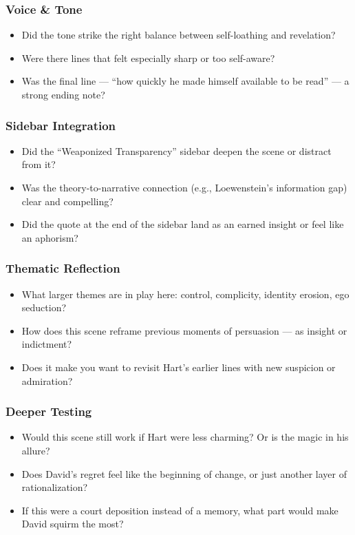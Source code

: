 \subsubsection*{Voice \& Tone}

\begin{itemize}
  \item Did the tone strike the right balance between self-loathing and revelation?
  \item Were there lines that felt especially sharp or too self-aware?
  \item Was the final line — ``how quickly he made himself available to be read'' — a strong ending note?
\end{itemize}

\subsubsection*{Sidebar Integration}

\begin{itemize}
  \item Did the ``Weaponized Transparency'' sidebar deepen the scene or distract from it?
  \item Was the theory-to-narrative connection (e.g., Loewenstein’s information gap) clear and compelling?
  \item Did the quote at the end of the sidebar land as an earned insight or feel like an aphorism?
\end{itemize}

\subsubsection*{Thematic Reflection}

\begin{itemize}
  \item What larger themes are in play here: control, complicity, identity erosion, ego seduction?
  \item How does this scene reframe previous moments of persuasion — as insight or indictment?
  \item Does it make you want to revisit Hart’s earlier lines with new suspicion or admiration?
\end{itemize}

\subsubsection*{Deeper Testing}

\begin{itemize}
  \item Would this scene still work if Hart were less charming? Or is the magic in his allure?
  \item Does David’s regret feel like the beginning of change, or just another layer of rationalization?
  \item If this were a court deposition instead of a memory, what part would make David squirm the most?
\end{itemize}





